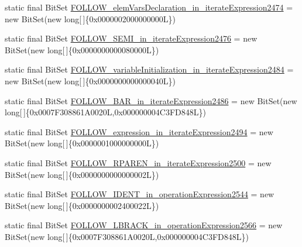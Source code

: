 \begin{DoxyCompactItemize}
\item 
static final Bit\-Set \hyperlink{classorg_1_1tzi_1_1use_1_1parser_1_1shell_1_1_shell_command_parser_a8cfb592f6650ab5fda4e6f8a67bc2421}{F\-O\-L\-L\-O\-W\-\_\-elem\-Vars\-Declaration\-\_\-in\-\_\-iterate\-Expression2474} = new Bit\-Set(new long\mbox{[}$\,$\mbox{]}\{0x0000002000000000\-L\})
\item 
static final Bit\-Set \hyperlink{classorg_1_1tzi_1_1use_1_1parser_1_1shell_1_1_shell_command_parser_aae07b8ae76e2b5f9516d5dabe4967d30}{F\-O\-L\-L\-O\-W\-\_\-\-S\-E\-M\-I\-\_\-in\-\_\-iterate\-Expression2476} = new Bit\-Set(new long\mbox{[}$\,$\mbox{]}\{0x0000000000080000\-L\})
\item 
static final Bit\-Set \hyperlink{classorg_1_1tzi_1_1use_1_1parser_1_1shell_1_1_shell_command_parser_ab04a75bf12747a6b2996dadc0aec3053}{F\-O\-L\-L\-O\-W\-\_\-variable\-Initialization\-\_\-in\-\_\-iterate\-Expression2484} = new Bit\-Set(new long\mbox{[}$\,$\mbox{]}\{0x0000000000000040\-L\})
\item 
static final Bit\-Set \hyperlink{classorg_1_1tzi_1_1use_1_1parser_1_1shell_1_1_shell_command_parser_ae3ef0078d8a9de362bb50479fbd93233}{F\-O\-L\-L\-O\-W\-\_\-\-B\-A\-R\-\_\-in\-\_\-iterate\-Expression2486} = new Bit\-Set(new long\mbox{[}$\,$\mbox{]}\{0x0007\-F308861\-A0020\-L,0x000000004\-C3\-F\-D848\-L\})
\item 
static final Bit\-Set \hyperlink{classorg_1_1tzi_1_1use_1_1parser_1_1shell_1_1_shell_command_parser_a647ba52417804e23a859875d71cc50e6}{F\-O\-L\-L\-O\-W\-\_\-expression\-\_\-in\-\_\-iterate\-Expression2494} = new Bit\-Set(new long\mbox{[}$\,$\mbox{]}\{0x0000001000000000\-L\})
\item 
static final Bit\-Set \hyperlink{classorg_1_1tzi_1_1use_1_1parser_1_1shell_1_1_shell_command_parser_a2fd01cb8a110b8a9b3db07d2ea7c6682}{F\-O\-L\-L\-O\-W\-\_\-\-R\-P\-A\-R\-E\-N\-\_\-in\-\_\-iterate\-Expression2500} = new Bit\-Set(new long\mbox{[}$\,$\mbox{]}\{0x0000000000000002\-L\})
\item 
static final Bit\-Set \hyperlink{classorg_1_1tzi_1_1use_1_1parser_1_1shell_1_1_shell_command_parser_ad5735b800fa3a56500a3a89a3f057993}{F\-O\-L\-L\-O\-W\-\_\-\-I\-D\-E\-N\-T\-\_\-in\-\_\-operation\-Expression2544} = new Bit\-Set(new long\mbox{[}$\,$\mbox{]}\{0x0000000002400022\-L\})
\item 
static final Bit\-Set \hyperlink{classorg_1_1tzi_1_1use_1_1parser_1_1shell_1_1_shell_command_parser_ab1f523321c91c5076715b37e6af97761}{F\-O\-L\-L\-O\-W\-\_\-\-L\-B\-R\-A\-C\-K\-\_\-in\-\_\-operation\-Expression2566} = new Bit\-Set(new long\mbox{[}$\,$\mbox{]}\{0x0007\-F308861\-A0020\-L,0x000000004\-C3\-F\-D848\-L\})

\end{DoxyCompactItemize}
